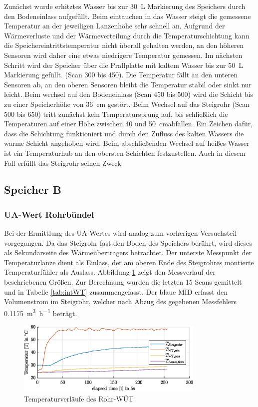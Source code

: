 Zunächst wurde erhitztes Wasser bis zur \SI{30}{\liter} Markierung des Speichers durch den Bodeneinlass aufgefüllt. Beim eintauchen in das Wasser steigt die gemessene Temperatur an der jeweiligen Lanzenhöhe sehr schnell an. Aufgrund der Wärmeverluste und der Wärmeverteilung durch die Temperaturschichtung kann die Speichereintrittstemperatur nicht überall gehalten werden, an den höheren Sensoren wird daher eine etwas niedrigere Temperatur gemessen. Im nächsten Schritt wird der Speicher über die Prallplatte mit kaltem Wasser bis zur \SI{50}{\liter} Markierung gefüllt. (Scan 300 bis 450). Die Temperatur fällt an den unteren Sensoren ab, an den oberen Sensoren bleibt die Temperatur stabil oder sinkt nur leicht. Beim wechsel auf den Bodeneinlass (Scan 450 bis 500) wird die Schicht bis zu einer Speicherhöhe von \SI{36}{\centi\meter} gestört. Beim Wechsel auf das Steigrohr (Scan 500 bis 650) tritt zunächst kein Temperatursprung auf, bis schließlich die Temperaturen auf einer Höhe zwischen 40 und \SI{50}{\centi\meter}abfallen. Ein Zeichen dafür, dass die Schichtung funktioniert und durch den Zufluss des kalten Wassers die warme Schicht angehoben wird. Beim abschließenden Wechsel auf heißes Wasser ist ein Temperaturhub an den obersten Schichten festzustellen. Auch in diesem Fall erfüllt das Steigrohr seinen Zweck.

\subsection{Speicher B}
\subsubsection{UA-Wert Rohrbündel}
Bei der Ermittlung des UA-Wertes wird analog zum vorherigen Versuchsteil vorgegangen. Da das Steigrohr fast den  Boden des Speichers berührt, wird dieses als Sekundärseite des Wärmeübertragers betrachtet. Der unterste Messpunkt der Temperaturlanze dient als Einlass, der am oberen Ende des Steigrohres montierte Temperaturfühler als Auslass. Abbildung \ref{fig:intWT} zeigt den Messverlauf der beschriebenen Größen. Zur Berechnung wurden die letzten 15 Scans gemittelt und in Tabelle \ref{tab:intWT} zusammengefasst. Der blaue MID erfasst den Volumenstrom im Steigrohr, welcher nach Abzug des gegebenen Messfehlers \SI{0,1175}{\cubic\meter\per\hour} beträgt.

\begin{figure}[H]
	\centering
	\includegraphics[width=0.8\textwidth]{../DATA/RohrWT_B.eps}
	\caption[Temperaturverläufe des Rohr-WÜT]{Temperaturverläufe des Rohr-WÜT}
	\label{fig:intWT}
\end{figure}


